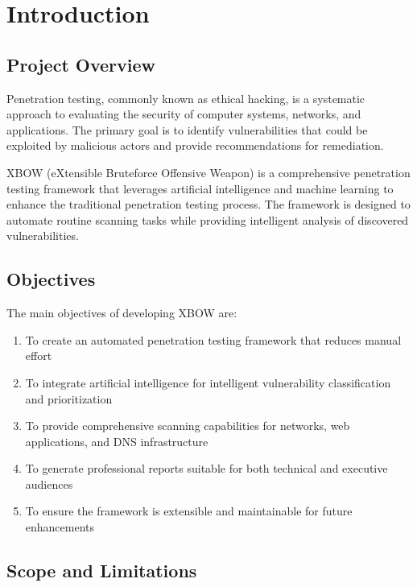 \documentclass[12pt,a4paper]{report}
\begin{document}
\listoffigures
\newpage

\listoftables
\newpage

\mainmatter

\chapter{Introduction}

\section{Project Overview}

Penetration testing, commonly known as ethical hacking, is a systematic approach to evaluating the security of computer systems, networks, and applications. The primary goal is to identify vulnerabilities that could be exploited by malicious actors and provide recommendations for remediation.

XBOW (eXtensible Bruteforce Offensive Weapon) is a comprehensive penetration testing framework that leverages artificial intelligence and machine learning to enhance the traditional penetration testing process. The framework is designed to automate routine scanning tasks while providing intelligent analysis of discovered vulnerabilities.

\section{Objectives}

The main objectives of developing XBOW are:

\begin{enumerate}
    \item To create an automated penetration testing framework that reduces manual effort
    \item To integrate artificial intelligence for intelligent vulnerability classification and prioritization
    \item To provide comprehensive scanning capabilities for networks, web applications, and DNS infrastructure
    \item To generate professional reports suitable for both technical and executive audiences
    \item To ensure the framework is extensible and maintainable for future enhancements
\end{enumerate}

\section{Scope and Limitations}
\end{document}
